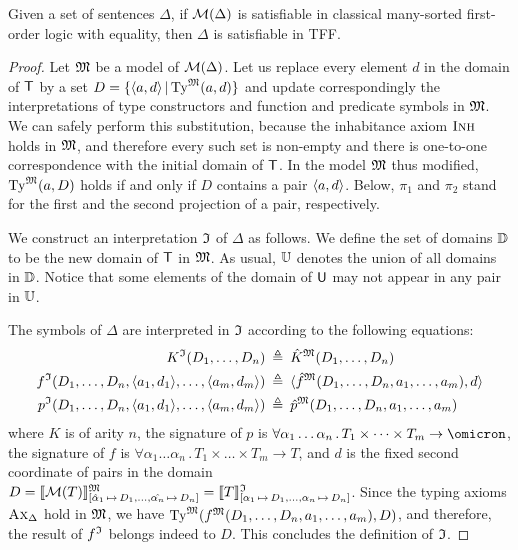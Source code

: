 \begin{theorem} \label{thm:mon_compl}
Given a set of sentences $\Delta$, if $\mathcal{M}(\Delta)$
is satisfiable in classical many-sorted first-order logic
with equality, then $\Delta$ is satisfiable in TFF.
\end{theorem}
\begin{proof}
Let $\mathfrak{M}$ be a model of $\mathcal{M}(\Delta)$. Let us replace every element $d$
in the domain of $\mathsf{T}$ by a set $D = \{\langle a,d \rangle \,|\, \mathrm{Ty}^{\mathfrak{M}}(a,d)\}$
and update correspondingly the interpretations of type constructors
and function and predicate symbols in $\mathfrak{M}$.
We can safely perform this substitution, because the inhabitance
axiom $\text{\sc Inh}$ holds in $\mathfrak{M}$, and therefore every such set is non-empty
and there is one-to-one correspondence with the initial domain of $\mathsf{T}$.
In the model $\mathfrak{M}$ thus modified, $\mathrm{Ty}^{\mathfrak{M}}(a,D)$ holds if and only if
$D$ contains a pair $\langle a,d \rangle$.
%
Below, $\pi_1$ and $\pi_2$ stand for the first and the second projection
of a pair, respectively.

We construct an interpretation $\mathfrak{I}$ of $\Delta$ as follows.
We define the set of domains $\mathbb{D}$ to be the new domain
of $\mathsf{T}$ in $\mathfrak{M}$. As usual, $\mathbb{U}$ denotes the union
of all domains in $\mathbb{D}$. Notice that some elements of
the domain of $\mathsf{U}$ may not appear in any pair in $\mathbb{U}$.

The symbols of $\Delta$ are interpreted in $\mathfrak{I}$
according to the following equations:
\begin{align*}
K^{\mathfrak{I}}(D_1,\dots,D_n) &\:\triangleq\: \hat{K}^{\mathfrak{M}}(D_1,\dots,D_n) \\
f^{\mathfrak{I}}(D_1,\dots,D_n,\langle a_1,d_1 \rangle,\dots,\langle a_m,d_m \rangle) &\:\triangleq\:
\langle \hat{f}^{\mathfrak{M}}(D_1,\dots,D_n,a_1,\dots,a_m), d \rangle \\
p^{\mathfrak{I}}(D_1,\dots,D_n,\langle a_1,d_1 \rangle,\dots,\langle a_m,d_m \rangle) &\:\triangleq\:
\hat{p}^{\mathfrak{M}}(D_1,\dots,D_n,a_1,\dots,a_m)
\end{align*}
where
$K$ is of arity $n$,
the signature of $p$ is
$\forall \alpha_1\dots\alpha_n \,.\, T_1 \times \dots \times T_m \to
\omicron$,
the signature of $f$ is
$\forall \alpha_1\dots\alpha_n \,.\, T_1 \times \dots \times T_m \to T$,
and $d$ is the fixed second coordinate of pairs in the domain
$D = \llbracket \mathcal{M}(T) \rrbracket^{\mathfrak{M}}_{[\hat{\alpha}_1\,\mapsto\,D_1,\dots,
\hat{\alpha_n}\,\mapsto\,D_n]} =
\llbracket T \rrbracket^{\mathfrak{I}}_{[\alpha_1\,\mapsto\,D_1,\dots,\alpha_n\,\mapsto\,D_n]}$.
Since the typing axioms $\text{\sc Ax}_{\Delta}$ hold in $\mathfrak{M}$, we have
$\mathrm{Ty}^{\mathfrak{M}}(f^{\mathfrak{M}}(D_1,\dots,D_n,a_1,\dots,a_m), D)$,
and therefore, the result of $f^{\mathfrak{I}}$ belongs indeed to $D$.
This concludes the definition of $\mathfrak{I}$.


\end{proof}
